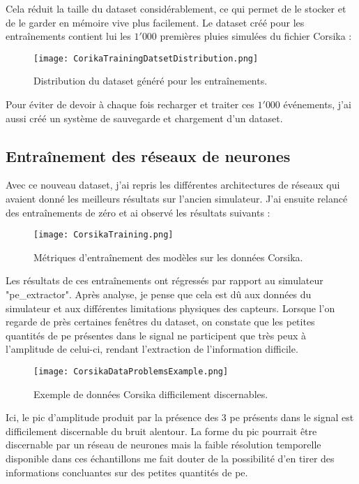 Cela réduit la taille du dataset considérablement, ce qui permet de le stocker et de le garder en mémoire vive plus facilement.
Le dataset créé pour les entraînements contient lui les $1'000$ premières pluies simulées du fichier Corsika :
\begin{figure}[tbph!]
	\centering
	\texttt{[image: CorikaTrainingDatsetDistribution.png]}
	\caption[Distribution du dataset généré pour les entraînements]{Distribution du dataset généré pour les entraînements.}
\end{figure}

Pour éviter de devoir à chaque fois recharger et traiter ces $1'000$ événements, j'ai aussi créé un système de sauvegarde et chargement d'un dataset.

\subsection{Entraînement des réseaux de neurones}
Avec ce nouveau dataset, j'ai repris les différentes architectures de réseaux qui avaient donné les meilleurs résultats sur l'ancien simulateur.
J'ai ensuite relancé des entraînements de zéro et ai observé les résultats suivants :

\begin{figure}[tbph!]
	\centering
	\texttt{[image: CorsikaTraining.png]}
	\caption[Métriques d'entraînement des modèles sur les données Corsika]{Métriques d'entraînement des modèles sur les données Corsika.}
\end{figure}

Les résultats de ces entraînements ont régressés par rapport au simulateur "pe\_extractor". 
Après analyse, je pense que cela est dû aux données du simulateur et aux différentes limitations physiques des capteurs.
Lorsque l'on regarde de près certaines fenêtres du dataset, on constate que les petites quantités de \gls{pe} présentes dans le signal
ne participent que très peux à l'amplitude de celui-ci, rendant l'extraction de l'information difficile.
\newpage
\begin{figure}[tbph!]
	\centering
	\texttt{[image: CorsikaDataProblemsExample.png]}
	\caption[Exemple de données Corsika difficilement discernables]{Exemple de données Corsika difficilement discernables.}
\end{figure}

Ici, le pic d'amplitude produit par la présence des 3 \gls{pe} présents dans le signal est difficilement discernable du bruit alentour.
La forme du pic pourrait être discernable par un réseau de neurones mais la faible résolution temporelle 
disponible dans ces échantillons me fait douter de la possibilité d'en tirer des informations concluantes sur 
des petites quantités de \gls{pe}.

